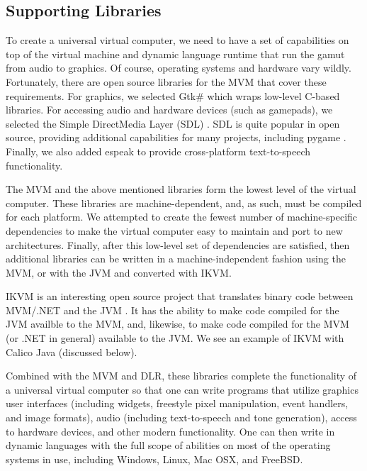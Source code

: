 \documentclass[preprint]{sigplanconf}
\begin{document}

\subsection{Supporting Libraries}

To create a universal virtual computer, we need to have a set of
capabilities on top of the virtual machine and dynamic language
runtime that run the gamut from audio to graphics. Of course,
operating systems and hardware vary wildly. Fortunately, there are
open source libraries for the MVM that cover these requirements. For
graphics, we selected Gtk\# \cite{gtk-sharp} which wraps low-level
C-based libraries. For accessing audio and hardware devices (such as
gamepads), we selected the Simple DirectMedia Layer (SDL)
\cite{sdl}. SDL is quite popular in open source, providing additional
capabilities for many projects, including pygame
\cite{pygame}. Finally, we also added espeak \cite{espeak} to provide
cross-platform text-to-speech functionality.


The MVM and the above mentioned libraries form the lowest level of the
virtual computer. These libraries are machine-dependent, and, as such,
must be compiled for each platform. We attempted to create the fewest
number of machine-specific dependencies to make the virtual computer
easy to maintain and port to new architectures.  Finally, after this
low-level set of dependencies are satisfied, then additional libraries
can be written in a machine-independent fashion using the MVM, or with
the JVM and converted with IKVM.

IKVM is an interesting open source project that translates binary code
between MVM/.NET and the JVM \cite{ikvm}. It has the ability to make
code compiled for the JVM availble to the MVM, and, likewise, to make
code compiled for the MVM (or .NET in general) available to the
JVM. We see an example of IKVM with Calico Java (discussed below).

Combined with the MVM and DLR, these libraries complete the
functionality of a universal virtual computer so that one can write
programs that utilize graphics user interfaces (including widgets,
freestyle pixel manipulation, event handlers, and image formats),
audio (including text-to-speech and tone generation), access to
hardware devices, and other modern functionality. One can then write
in dynamic languages with the full scope of abilities on most of the
operating systems in use, including Windows, Linux, Mac OSX, and
FreeBSD.
\end{document}
